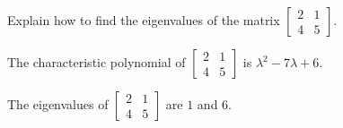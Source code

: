 
\begin{exerciseStatement}


Explain how to find the eigenvalues of the matrix \( \left[\begin{array}{cc}
2 & 1 \\
4 & 5
\end{array}\right] \).


\end{exerciseStatement}
    
\begin{exerciseAnswer} 


The characteristic polynomial of \( \left[\begin{array}{cc}
2 & 1 \\
4 & 5
\end{array}\right] \) is \( \lambda^{2} - 7 \lambda + 6 \).



The eigenvalues of \( \left[\begin{array}{cc}
2 & 1 \\
4 & 5
\end{array}\right] \) are \( 1 \) and \( 6 \).


\end{exerciseAnswer}
    

